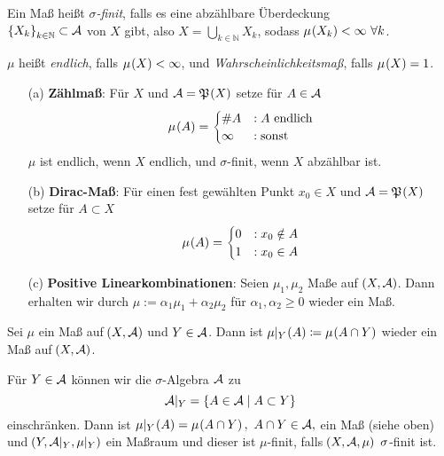 \documentclass[skript.tex]{subfiles}
\begin{document}
	\begin{defin}
		Ein Maß heißt \textit{$\sigma$-finit}, falls es eine abzählbare Überdeckung \\ $\left\{X_k\right\}_{k\in\mathbb{N}} \subset \mathcal{A}$ von $X$ gibt, also $X=\bigcup_{k\in\mathbb{N}} X_k$, sodass $\mu\pr{X_k} < \infty\ \forall k$.
		
		$\mu$ heißt \textit{endlich}, falls $\mu\pr{X}<\infty$, und \textit{Wahrscheinlichkeitsmaß}, falls $\mu\pr{X}=1$.
	\end{defin}

	\begin{bsp}
		\hfill
		\begin{itemize}
			\item[(a)] \textbf{Zählmaß}: Für $X$ und $\mc{A}=\mf{P}\pr{X}$ setze für $A \in \mathcal{A}$
				\begin{equation*}
					\mu\pr{A} = 
					\begin{cases}
						\#A &: A \text{ endlich}\\
						\infty &: \text{sonst}
					\end{cases}
				\end{equation*}
				$\mu$ ist endlich, wenn $X$ endlich, und $\sigma$-finit, wenn $X$ abzählbar ist.
				
			\item[(b)] \textbf{Dirac-Maß}: Für einen fest gewählten Punkt $x_0 \in X$ und $\mc{A}=\mf{P}\pr{X}$ setze für $A \subset X$
				\begin{equation*}
					\mu\pr{A} = 
						\begin{cases}
							0 &: x_0 \notin A\\
							1 &: x_0 \in A
						\end{cases}
				\end{equation*}
			
			\item[(c)] \textbf{Positive Linearkombinationen}: Seien $\mu_1, \mu_2$ Maße auf $\pr{X, \mc{A}}$. Dann erhalten wir durch $\mu:= \alpha_1\mu_1 + \alpha_2\mu_2$ für $\alpha_1, \alpha_2 \geq 0$ wieder ein Maß. 
		\end{itemize} 
	\end{bsp}

	\begin{bsp}
		Sei $\mu$ ein Maß auf $\pr{X,\mc{A}}$ und $Y\in\mathcal{A}$. Dann ist $\mu|_{Y}\pr{A} \coloneqq \mu\pr{A\cap Y}$ wieder ein Maß auf $\pr{X, \mc{A}}$. 
	\end{bsp}
	
	\begin{bem*}
		Für $Y \in \mathcal{A}$ können wir die $\sigma$-Algebra $\mathcal{A}$ zu 
		\begin{equation*}
			\mathcal{A}|_{Y} = \left\{A \in \mathcal{A} \mid A \subset Y\right\}
		\end{equation*}
		einschränken. Dann ist $\mu|_Y\pr{A} = \mu\pr{A\cap Y},\ A\cap Y \in \mc{A},$ ein Maß (siehe oben) und $\pr{Y,\mc{A}|_Y,\mu|_Y}$ ein Maßraum und dieser ist $\mu$-finit, falls $\pr{X,\mc{A},\mu}\ \sigma$-finit ist. 
	\end{bem*}
	
\end{document}
